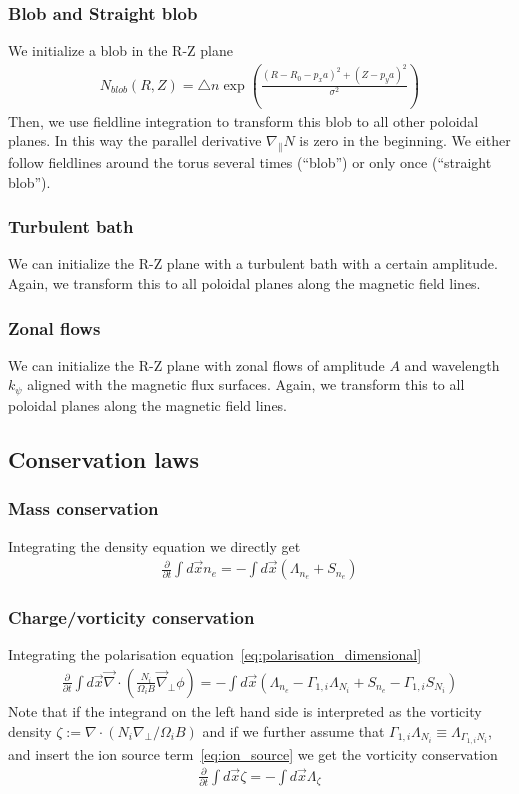 \subsubsection{Blob and Straight blob}
We initialize a blob in the R-Z plane
\begin{align}
  N_{blob}(R,Z) = \triangle n \exp\left( \frac{(R - R_0 - p_x a)^2 + (Z-p_ya)^2}{\sigma^2} \right)
  \label{}
\end{align}
Then, we use fieldline integration to transform this blob to all other poloidal planes. In this way the parallel derivative $\nabla_\parallel N$ is zero in the beginning.
We either follow fieldlines around the torus several times (``blob'') or only once
(``straight blob'').
\subsubsection{Turbulent bath}
We can initialize the R-Z plane with a turbulent bath with a certain amplitude.
Again, we transform this to all poloidal planes along the magnetic field lines.
\subsubsection{Zonal flows}
We can initialize the R-Z plane with zonal flows of amplitude $A$ and wavelength $k_\psi$ aligned with the magnetic flux surfaces.
Again, we transform this to all poloidal planes along the magnetic field lines.

\subsection{Conservation laws} \label{sec:conservation}
\subsubsection{Mass conservation}
Integrating the density equation we directly get
\begin{align}
  \frac{\partial}{\partial t} \int d\vec{x} n_e =  - \int d\vec{x} (\Lambda_{n_e}+S_{n_e})
\end{align}
\subsubsection{Charge/vorticity conservation}
Integrating the polarisation equation~\eqref{eq:polarisation_dimensional}
\begin{align}
  \frac{\partial}{\partial t} \int d\vec{x} \vec{\nabla} \cdot\left(\frac{N_i}{\Omega_i B} \vec{\nabla}_\perp \phi\right) =  - \int d\vec{x} (\Lambda_{n_e} - \Gamma_{1,i}\Lambda_{N_i} + S_{n_e} - \Gamma_{1,i}S_{N_i})
\end{align}
Note that if the integrand on the left hand side is interpreted as the \ExB vorticity
density
$\zeta := \nabla\cdot( N_i\nabla_\perp/\Omega_i B)$
and if we further assume that $\Gamma_{1,i} \Lambda_{N_i} \equiv \Lambda_{\Gamma_{1,i}N_i}$, and insert the ion source term~\eqref{eq:ion_source}
we get the vorticity conservation
\begin{align}
  \frac{\partial}{\partial t} \int d\vec{x} \zeta =  - \int d\vec{x}\Lambda_{\zeta}
  \label{}
\end{align}

